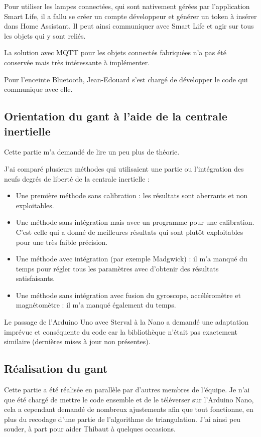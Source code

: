 \documentclass{article}
\begin{document}
            Pour utiliser les lampes connectées, qui sont nativement gérées par l'application Smart Life, il a fallu se créer un compte développeur
                et générer un token à insérer dans Home Assistant. Il peut ainsi communiquer avec Smart Life et agir sur tous les objets qui y sont reliés.

            La solution avec MQTT pour les objets connectés fabriquées n'a pas été conservée mais très intéressante à implémenter.

            Pour l'enceinte Bluetooth, Jean-Edouard s'est chargé de développer le code qui communique avec elle.

        \subsection{Orientation du gant à l'aide de la centrale inertielle}

            Cette partie m'a demandé de lire un peu plus de théorie.

            J'ai comparé plusieurs méthodes qui utilisaient une partie ou l'intégration des neufs degrés de liberté de la centrale inertielle :
            \begin{itemize}
                \item Une première méthode sans calibration : les résultats sont aberrants et non exploitables.
                \item Une méthode sans intégration mais avec un programme pour une calibration. C'est celle qui a donné de meilleures résultats 
                        qui sont plutôt exploitables pour une très faible précision.
                \item Une méthode avec intégration (par exemple Madgwick) : il m'a manqué du temps pour régler tous les paramètres avec d'obtenir des résultats satisfaisants.
                \item Une méthode sans intégration avec fusion du gyroscope, accéléromètre et magnétomètre : il m'a manqué également du temps.
            \end{itemize}
            
            Le passage de l'Arduino Uno avec Sterval à la Nano a demandé une adaptation imprévue et conséquente du code car la bibliothèque n'était pas exactement similaire
                (dernières mises à jour non présentes).
            
            
        \subsection{Réalisation du gant}
            Cette partie a été réalisée en parallèle par d'autres membres de l'équipe. 
            Je n'ai que été chargé de mettre le code ensemble et de le téléverser sur l'Arduino Nano, cela a cependant demandé
                de nombreux ajustements afin que tout fonctionne, en plus du recodage d'une partie de l'algorithme de triangulation.
            J'ai ainsi peu souder, à part pour aider Thibaut à quelques occasions.
\end{document}
